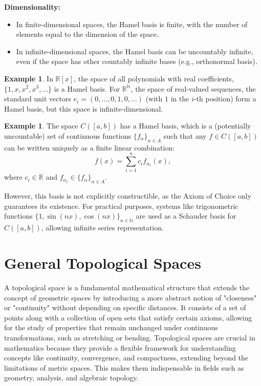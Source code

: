 \documentclass[12pt, reqno]{amsart}
\theoremstyle{definition}
\newtheorem{example}[theorem]{Example}
\numberwithin{equation}{section}
\begin{document}
\noindent \textbf{Dimensionality:}
\begin{itemize}
    \item In finite-dimensional spaces, the Hamel basis is finite, with the number of elements equal to the dimension of the space.
    \item In infinite-dimensional spaces, the Hamel basis can be uncountably infinite, even if the space has other countably infinite bases (e.g., orthonormal basis).
\end{itemize}


\begin{example}
    In $\mathbb{R}[x]$, the space of all polynomials with real coefficients, $\{1, x, x^2, x^3, \dots\}$ is a Hamel basis. For $\mathbb{R}^\mathbb{N}$, the space of real-valued sequences, the standard unit vectors $e_i = (0, \dots, 0, 1, 0, \dots)$ (with $1$ in the $i$-th position) form a Hamel basis, but this space is infinite-dimensional.
\end{example}

\begin{example}
The space $C([a,b])$ has a Hamel basis, which is a (potentially uncountable) set of continuous functions $\{f_\alpha\}_{\alpha \in A}$ such that any $f \in C([a,b])$ can be written uniquely as a finite linear combination:
\[
f(x) = \sum_{i=1}^n c_i f_{\alpha_i}(x),
\]
where $c_i \in \mathbb{R}$ and $f_{\alpha_i} \in \{f_\alpha\}_{\alpha \in A}$.

However, this basis is not explicitly constructible, as the Axiom of Choice only guarantees its existence. For practical purposes, systems like trigonometric functions $\{1, \sin(nx), \cos(nx)\}_{n \in \mathbb{N}}$ are used as a Schauder basis for $C([a,b])$, allowing infinite series representation.
\end{example}


\pagebreak

\section{General Topological Spaces} 
A topological space is a fundamental mathematical structure that extends the concept of geometric spaces by introducing a more abstract notion of "closeness" or "continuity" without depending on specific distances. It consists of a set of points along with a collection of open sets that satisfy certain axioms, allowing for the study of properties that remain unchanged under continuous transformations, such as stretching or bending. Topological spaces are crucial in mathematics because they provide a flexible framework for understanding concepts like continuity, convergence, and compactness, extending beyond the limitations of metric spaces. This makes them indispensable in fields such as geometry, analysis, and algebraic topology.
\end{document}
